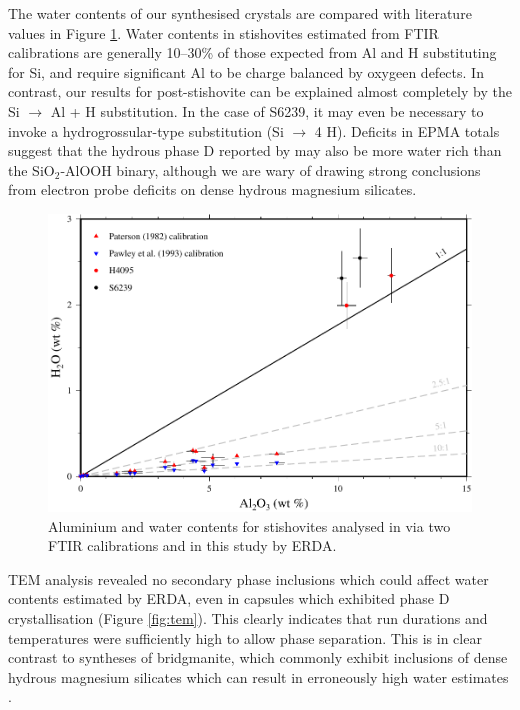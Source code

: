 \documentclass[review]{elsarticle}
\begin{document}
The water contents of our synthesised crystals are compared with literature values in Figure \ref{fig:water_contents}. Water contents in stishovites estimated from FTIR calibrations are generally 10--30\% of those expected from Al and H substituting for Si, and require significant Al to be charge balanced by oxygeen defects. In contrast, our results for post-stishovite can be explained almost completely by the Si $\rightarrow$ Al + H substitution. In the case of S6239, it may even be necessary to invoke a hydrogrossular-type substitution (Si $\rightarrow$ 4 H). Deficits in EPMA totals suggest that the hydrous phase D reported by \cite{Pamatoetal2015} may also be more water rich than the SiO$_2$-AlOOH binary, although we are wary of drawing strong conclusions from electron probe deficits on dense hydrous magnesium silicates.

\begin{figure}[ht!]
  \centering
  \includegraphics[width=1.0\textwidth]{figures/stv_water_contents.pdf}
  \caption{Aluminium and water contents for stishovites analysed in \cite{LLSHLOB2007} via two FTIR calibrations and in this study by ERDA.}
  \label{fig:water_contents}
\end{figure}


TEM analysis revealed no secondary phase inclusions which could affect water contents estimated by ERDA, even in capsules which exhibited phase D crystallisation (Figure \ref{fig:tem}). This clearly indicates that run durations and temperatures were sufficiently high to allow phase separation. This is in clear contrast to syntheses of bridgmanite, which commonly exhibit inclusions of dense hydrous magnesium silicates which can result in erroneously high water estimates \citep{KB2006}.  
\end{document}
